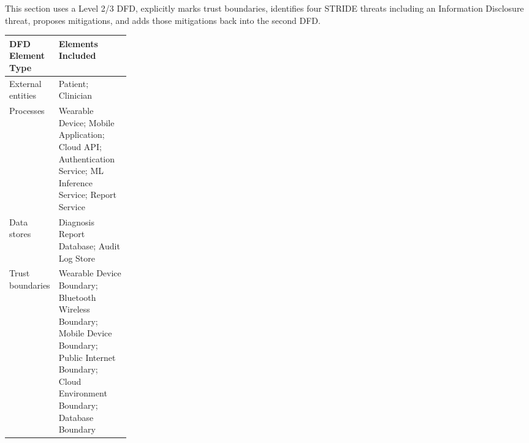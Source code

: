 \documentclass[11pt,a4paper]{article}
\begin{document}
This section uses a Level 2/3 DFD, explicitly marks trust boundaries, identifies four STRIDE threats including an Information Disclosure threat, proposes mitigations, and adds those mitigations back into the second DFD.

\begin{table}[H]
\centering
\begin{tabularx}{\linewidth}{>{\raggedright\arraybackslash}p{0.23\linewidth} >{\raggedright\arraybackslash}X}
\toprule
\textbf{DFD Element Type} & \textbf{Elements Included}\\
\midrule
External entities & Patient; Clinician\\
Processes & Wearable Device; Mobile Application; Cloud API; Authentication Service; ML Inference Service; Report Service\\
Data stores & Diagnosis Report Database; Audit Log Store\\
Trust boundaries & Wearable Device Boundary; Bluetooth Wireless Boundary; Mobile Device Boundary; Public Internet Boundary; Cloud Environment Boundary; Database Boundary\\
\bottomrule
\end{tabularx}
\end{table}
\end{document}
